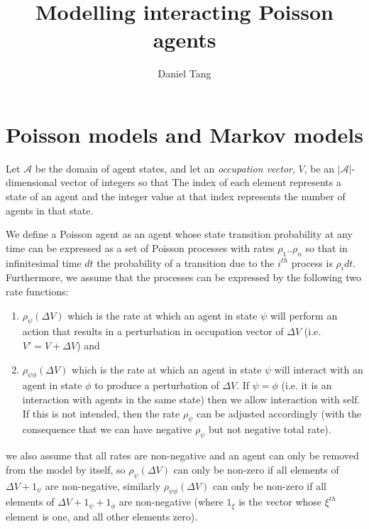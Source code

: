 \documentclass[a4paper]{article}
\title{Modelling interacting Poisson agents}
\author{Daniel Tang}
\begin{document}
\maketitle

\section{Poisson models and Markov models}

Let $\mathcal{A}$ be the domain of agent states, and let an \textit{occupation vector}, $V$, be an $|\mathcal{A}|$-dimensional vector of integers so that The index of each element represents a state of an agent and the integer value at that index represents the number of agents in that state.

We define a Poisson agent as an agent whose state transition probability at any time can be expressed as a set of Poisson processes with rates $\rho_1..\rho_n$ so that in infinitesimal time $dt$ the probability of a transition due to the $i^{th}$ process is $\rho_i dt$. Furthermore, we assume that the processes can be expressed by the following two rate functions:
\begin{enumerate}
	\item $\rho_\psi(\Delta V)$ which is the rate at which an agent in state $\psi$ will perform an action that results in a perturbation in occupation vector of $\Delta V$ (i.e. $V' = V + \Delta V$) and
	
	\item $\rho_{\psi\phi}(\Delta V)$ which is the rate at which an agent in state $\psi$ will interact with an agent in state $\phi$ to produce a perturbation of $\Delta V$. If $\psi = \phi$ (i.e. it is an interaction with agents in the same state) then we allow interaction with self. If this is not intended, then the rate $\rho_\psi$ can be adjusted accordingly (with the consequence that we can have negative $\rho_\psi$ but not negative total rate).
\end{enumerate}


we also assume that all rates are non-negative and an agent can only be removed from the model by itself, so $\rho_\psi(\Delta V)$ can only be non-zero if all elements of $\Delta V + 1_\psi$ are non-negative, similarly $\rho_{\psi\phi}(\Delta V)$ can only be non-zero if all elements of $\Delta V + 1_\psi + 1_\phi$ are non-negative (where $1_\xi$ is the vector whose $\xi^{th}$ element is one, and all other elements zero).
\end{document}
